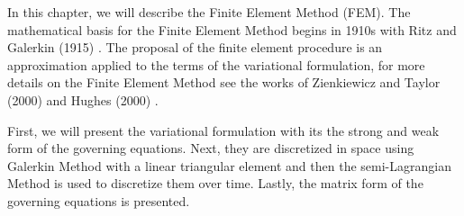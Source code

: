In this chapter, we will describe the Finite Element Method (FEM). 
The mathematical basis for the Finite Element Method begins in 1910s
 with Ritz \cite{ritz1909} and Galerkin (1915) \cite{galerkin1915}.
The proposal of the finite element procedure is 
an approximation applied to the terms of the 
variational formulation, 
for more details on the Finite Element Method see the works of 
Zienkiewicz and Taylor (2000) \cite{zienkiewiczvol3} and
Hughes (2000) \cite{hughes2000}.
\par

First, we will present the variational formulation with its
the strong and weak form of the
governing equations. 
Next, they are discretized in space using Galerkin Method 
with a linear triangular element and then
the semi-Lagrangian Method is used to discretize
them over time.
Lastly, the matrix form
of the governing equations is presented.
